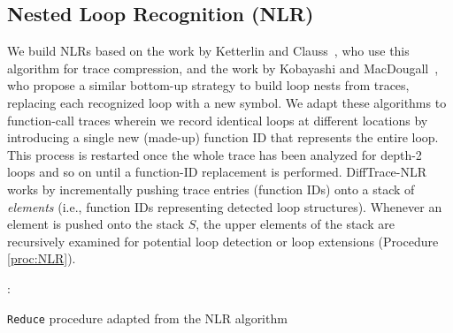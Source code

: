 \subsection{Nested Loop Recognition (NLR)}
\label{subsec:algo-nlr}

We build NLRs based on the work by Ketterlin and Clauss~\cite{Ketterlin-nlr},
who use this algorithm for trace compression,
and the work by Kobayashi and MacDougall~\cite{kobayashi-84}, who propose
a similar bottom-up strategy to build loop nests from traces,
replacing each recognized loop with a new symbol.
%
%
%
%
We adapt these algorithms
to function-call traces
wherein we record
identical loops at different locations by introducing
a single new (made-up) function ID that represents the entire loop.
%
This process is restarted once the whole trace has been analyzed for depth-2 loops and so on until a function-ID replacement is performed.
%
DiffTrace-NLR works by incrementally pushing trace entries (function IDs)
onto a stack of \textit{elements} (i.e., function IDs
representing detected loop structures).
%
Whenever an element is pushed onto the stack $S$,
the upper elements of the stack are recursively
examined for potential loop detection or loop extensions (Procedure \ref{proc:NLR}).


\begin{small}
\begin{algorithm}[]
 \DontPrintSemicolon
 :{\\
 \Indp
 }

 \caption{\texttt{Reduce} procedure adapted from the NLR algorithm }
 \label{proc:NLR}
\end{algorithm}
\end{small}

